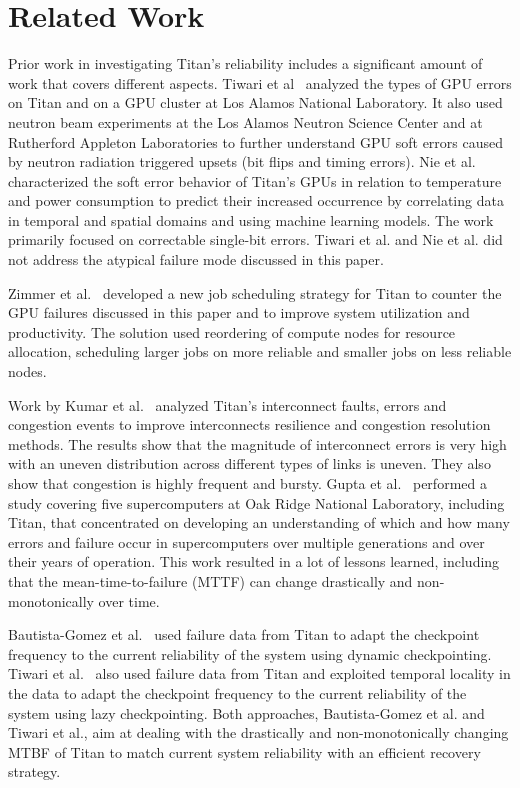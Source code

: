 \section{Related Work}
\label{sec:related}

Prior work in investigating Titan's reliability includes a significant amount of work that covers different aspects.
%
Tiwari et al~\cite{7056044} analyzed the types of GPU errors on Titan and on a GPU cluster at Los Alamos National Laboratory. It also used neutron beam experiments at the Los Alamos Neutron Science Center and at Rutherford Appleton Laboratories to further understand GPU soft errors caused by neutron radiation triggered upsets (bit flips and timing errors).
%
Nie et al.~\cite{nie17characterizing,nie18machine} characterized the soft error behavior of Titan's GPUs in relation to temperature and power consumption to predict their increased occurrence by correlating data in temporal and spatial domains and using machine learning models. The work primarily focused on correctable single-bit errors.
%
Tiwari et al. and Nie et al. did not address the atypical failure mode discussed in this paper.

Zimmer et al.~\cite{8665764} developed a new job scheduling strategy for Titan to counter the GPU failures discussed in this paper and to improve system utilization and productivity. The solution used reordering of compute nodes for resource allocation, scheduling larger jobs on more reliable and smaller jobs on less reliable nodes.


Work by Kumar et al.~\cite{kumar18understanding} analyzed Titan's interconnect faults, errors and congestion events to improve interconnects resilience and congestion resolution methods. The results show that the magnitude of interconnect errors is very high with an uneven distribution across different types of links is uneven. They also show that congestion is highly frequent and bursty.
%
Gupta et al.~\cite{gupta17failures} performed a study covering five supercomputers at Oak Ridge National Laboratory, including Titan, that concentrated on developing an understanding of which and how many errors and failure occur in supercomputers over multiple generations and over their years of operation. This work resulted in a lot of lessons learned, including that the mean-time-to-failure (MTTF) can change drastically and non-monotonically over time.

Bautista-Gomez et al.~\cite{bautista-gomez16reducing} used failure data from Titan to adapt the checkpoint frequency to the current reliability of the system using dynamic checkpointing.
%
Tiwari et al.~\cite{6903564} also used failure data from Titan and exploited temporal locality in the data to adapt the checkpoint frequency to the current reliability of the system using lazy checkpointing.
%
Both approaches, Bautista-Gomez et al. and Tiwari et al., aim at dealing with the drastically and non-monotonically changing MTBF of Titan to match current system reliability with an efficient recovery strategy.

